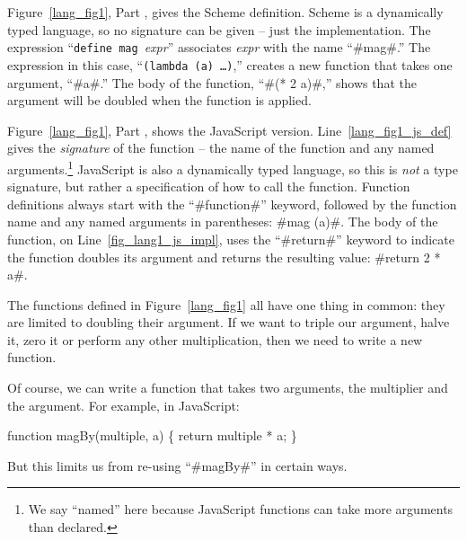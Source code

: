 \documentclass[12pt]{report}
\begin{document}
Figure~\ref{lang_fig1}, Part , gives the
Scheme definition. Scheme is a dynamically typed language, so no
signature can be given -- just the implementation. The expression
``\texttt{define mag}\ \emph{expr}'' associates \emph{expr} with the
name ``#mag#.'' The expression in this case, ``\texttt{(lambda (a)
  \ldots)},'' creates a new function that takes one argument, ``#a#.''
The body of the function, ``#(* 2 a)#,'' shows that the argument will
be doubled when the function is applied.


Figure~\ref{lang_fig1}, Part , shows the
JavaScript version. Line~\ref{lang_fig1_js_def} gives the
\emph{signature} of the function -- the name of the function and any
named arguments.\footnote{We say ``named'' here because JavaScript
  functions can take more arguments than declared.}  JavaScript is
also a dynamically typed language, so this is \emph{not} a type
signature, but rather a specification of how to call the
function. Function definitions always start with the ``#function#''
keyword, followed by the function name and any named arguments in
parentheses: #mag (a)#. The body of the function, on
Line~\ref{fig_lang1_js_impl}, uses the ``#return#'' keyword to
indicate the function doubles its argument and returns the resulting
value: #return 2 * a#.

The functions defined in Figure~\ref{lang_fig1} all have one thing in
common: they are limited to doubling their argument. If we want to
triple our argument, halve it, zero it or perform any other
multiplication, then we need to write a new function.

Of course, we can write a function that takes two arguments, the
multiplier and the argument. For example, in JavaScript:
\begin{AVerb}
function magBy(multiple, a) \{
  return multiple * a;
\}
\end{AVerb}
But this limits us from re-using ``#magBy#'' in certain ways. 
\end{document}
